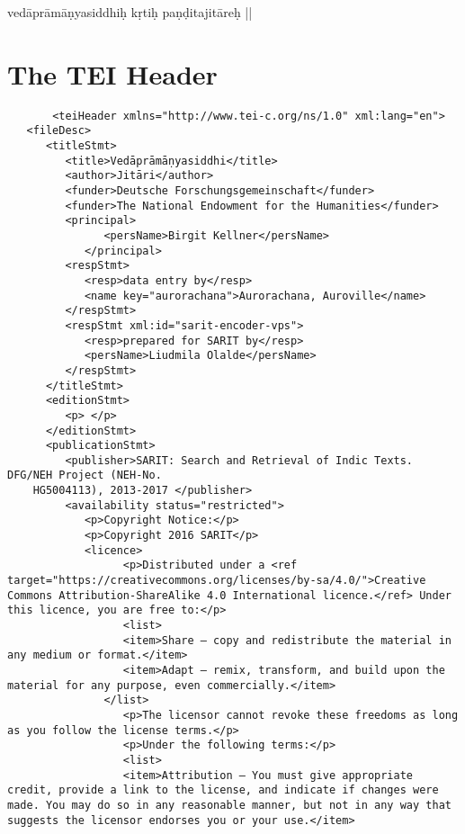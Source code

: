 \documentclass[article,12pt,a4paper]{memoir}%
\begin{document}
		\pstart
		\begin{center}
	      vedāprāmāṇyasiddhiḥ kṛtiḥ paṇḍitajitāreḥ ||
		\end{center}
		\pend
		
	      
	    
	    \endnumbering%
	    
     \backmatter 
	 \chapter{The TEI Header}
	 \begin{verbatim}
       <teiHeader xmlns="http://www.tei-c.org/ns/1.0" xml:lang="en">
   <fileDesc>
      <titleStmt>
         <title>Vedāprāmāṇyasiddhi</title>
         <author>Jitāri</author>
         <funder>Deutsche Forschungsgemeinschaft</funder>
         <funder>The National Endowment for the Humanities</funder>
         <principal>
	           <persName>Birgit Kellner</persName>
	        </principal>
         <respStmt>
            <resp>data entry by</resp>
            <name key="aurorachana">Aurorachana, Auroville</name>
         </respStmt>
         <respStmt xml:id="sarit-encoder-vps">
            <resp>prepared for SARIT by</resp>
            <persName>Liudmila Olalde</persName>
         </respStmt>
      </titleStmt>
      <editionStmt>
         <p> </p>
      </editionStmt>
      <publicationStmt>
         <publisher>SARIT: Search and Retrieval of Indic Texts. DFG/NEH Project (NEH-No.
	HG5004113), 2013-2017 </publisher>
         <availability status="restricted">
            <p>Copyright Notice:</p>
            <p>Copyright 2016 SARIT</p>
            <licence> 
	              <p>Distributed under a <ref target="https://creativecommons.org/licenses/by-sa/4.0/">Creative Commons Attribution-ShareAlike 4.0 International licence.</ref> Under this licence, you are free to:</p>
	              <list>
                  <item>Share — copy and redistribute the material in any medium or format.</item>
                  <item>Adapt — remix, transform, and build upon the material for any purpose, even commercially.</item>
               </list>
	              <p>The licensor cannot revoke these freedoms as long as you follow the license terms.</p>
	              <p>Under the following terms:</p>
	              <list>
                  <item>Attribution — You must give appropriate credit, provide a link to the license, and indicate if changes were made. You may do so in any reasonable manner, but not in any way that suggests the licensor endorses you or your use.</item>

\end{verbatim}
\end{document}
